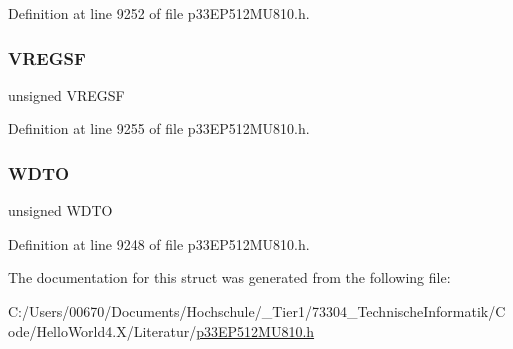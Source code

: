 Definition at line 9252 of file p33\+E\+P512\+M\+U810.\+h.

\mbox{\label{structtag_r_c_o_n_b_i_t_s_a467e9a0e3ce91cf31536ecb1d4b87bf3}} 
\subsubsection{\texorpdfstring{V\+R\+E\+G\+SF}{VREGSF}}
{\footnotesize\ttfamily unsigned V\+R\+E\+G\+SF}



Definition at line 9255 of file p33\+E\+P512\+M\+U810.\+h.

\mbox{\label{structtag_r_c_o_n_b_i_t_s_a5698f00cd46c9f390b7bd90e441eab0c}} 
\subsubsection{\texorpdfstring{W\+D\+TO}{WDTO}}
{\footnotesize\ttfamily unsigned W\+D\+TO}



Definition at line 9248 of file p33\+E\+P512\+M\+U810.\+h.



The documentation for this struct was generated from the following file\+:\begin{DoxyCompactItemize}
\item 
C\+:/\+Users/00670/\+Documents/\+Hochschule/\+\_\+\+Tier1/73304\+\_\+\+Technische\+Informatik/\+Code/\+Hello\+World4.\+X/\+Literatur/\hyperlink{p33_e_p512_m_u810_8h}{p33\+E\+P512\+M\+U810.\+h}\end{DoxyCompactItemize}
